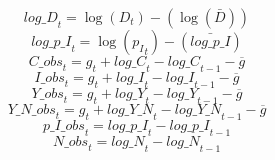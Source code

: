 \begin{dmath}
{log\_D}_{t}=\log\left({{D}}_{t}\right)-(\log\left(\bar{{D}}\right))
\end{dmath}
\begin{dmath}
{log\_p\_I}_{t}=\log\left({{p_I}}_{t}\right)-(\bar{log\_p\_I})
\end{dmath}
\begin{dmath}
{C\_obs}_{t}={{g}}_{t}+{log\_C}_{t}-{log\_C}_{t-1}-{{\overline{g}}}
\end{dmath}
\begin{dmath}
{I\_obs}_{t}={{g}}_{t}+{log\_I}_{t}-{log\_I}_{t-1}-{{\overline{g}}}
\end{dmath}
\begin{dmath}
{Y\_obs}_{t}={{g}}_{t}+{log\_Y}_{t}-{log\_Y}_{t-1}-{{\overline{g}}}
\end{dmath}
\begin{dmath}
{Y\_N\_obs}_{t}={{g}}_{t}+{log\_Y\_N}_{t}-{log\_Y\_N}_{t-1}-{{\overline{g}}}
\end{dmath}
\begin{dmath}
{p\_I\_obs}_{t}={log\_p\_I}_{t}-{log\_p\_I}_{t-1}
\end{dmath}
\begin{dmath}
{N\_obs}_{t}={log\_N}_{t}-{log\_N}_{t-1}
\end{dmath}

